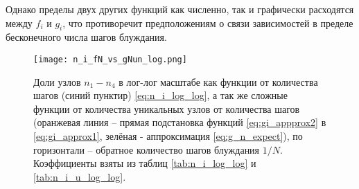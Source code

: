 Однако пределы двух других функций как численно, так и графически расходятся между $f_i$ и $g_i$, что противоречит предположениям о связи зависимостей в пределе бесконечного числа шагов блуждания.


\begin{figure}
\centering
\texttt{[image: n\_i\_fN\_vs\_gNun\_log.png]}
\label{fig:ni_fn_vs_gNun_log}
\caption{Доли узлов $n_1-n_4$ в лог-лог масштабе как функции от количества шагов (синий пунктир) \eqref{eq:n_i_log_log}, а так же сложные функции от количества уникальных узлов от количества шагов (оранжевая линия -- прямая подстановка функций  \eqref{eq:gi_appprox2} в \eqref{eq:gi_approx1}, зелёная - аппроксимация \eqref{eq:g_n_expect}), по горизонтали -- обратное количество шагов блуждания $1/N$. Коэффициенты взяты из таблиц \ref{tab:n_i_log_log} и \ref{tab:n_i_u_log_log}.}
\end{figure}